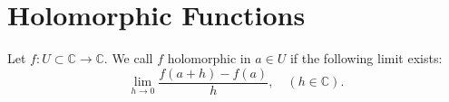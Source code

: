 \section{Holomorphic Functions}

\begin{definition}
    Let $f:U \subset \mathbb C \to \mathbb C$. We call $f$ holomorphic
    in $a \in U$ if the following limit exists:
    \begin{displaymath}
        \lim_{h\to 0} \frac{f(a+h) - f(a)}{h}, \quad (h \in \mathbb C).
    \end{displaymath}
    
\end{definition}
